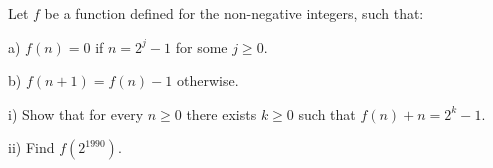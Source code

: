 Let $f$ be a function defined for the non-negative integers, such that:

a) $f(n)=0$ if $n=2^{j}-1$ for some $j \geq 0$.

b) $f(n+1)=f(n)-1$ otherwise.

i) Show that for every $n \geq 0$ there exists $k \geq 0$ such that $f(n)+n=2^{k}-1$.

ii) Find $f(2^{1990})$.